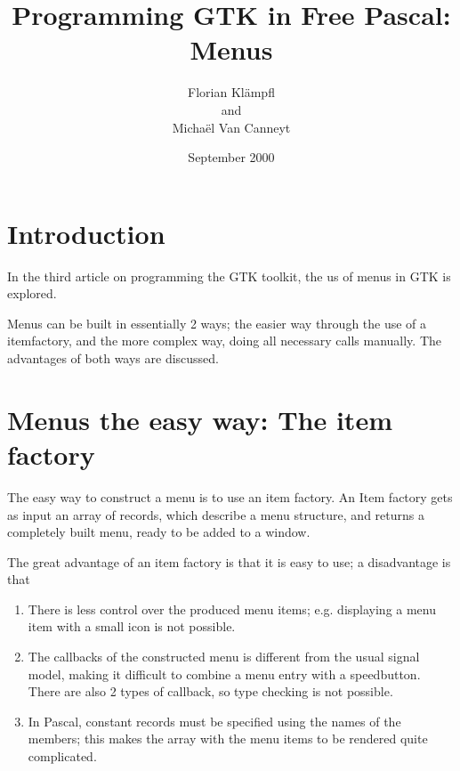 \documentclass[10pt]{article}
\begin{document}
\title{Programming GTK in Free Pascal:\\ Menus 
}
\author{Florian Kl\"ampfl\\and\\Micha\"el Van Canneyt}
\date{September 2000}
\maketitle
\section{Introduction}
In the third article on programming the GTK toolkit, the us of menus in GTK
is explored.

Menus can be built in essentially 2 ways; the easier way through the
use of a itemfactory, and the more complex way, doing all necessary calls
manually. The advantages of both ways are discussed.


\section{Menus the easy way: The item factory}
The easy way to construct a menu is to use an item factory. An Item factory
gets as input an array of records, which describe a menu structure, and
returns a completely built menu, ready to be added to a window.

The great advantage of an item factory is that it is easy to use; a
disadvantage is that 
\begin{enumerate}
\item There is less control over the produced menu items; e.g. 
displaying a menu item with a small icon is not possible.
\item The callbacks of the constructed menu is different from the usual 
signal model, making it difficult to combine a menu entry with a
speedbutton. There are also 2 types of callback, so type checking is not
possible.
\item In Pascal, constant records must be specified using the names of the
members; this makes the array with the menu items to be rendered quite
complicated.
\end{enumerate}
\end{document}
